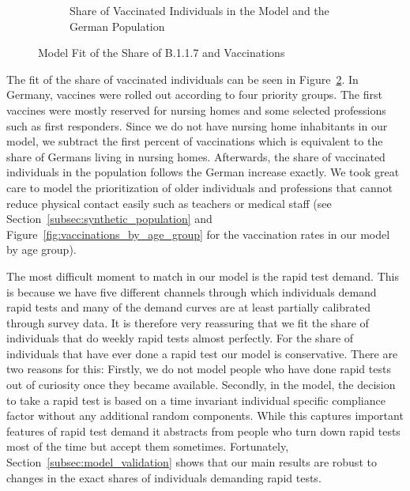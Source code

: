 \begin{figure}[ht]
\begin{subfigure}[b]{0.425\textwidth}
    \caption{Share of Vaccinated Individuals in the Model and the German Population}
    \label{fig:fit_vaccinations}
  \end{subfigure}
  \caption{Model Fit of the Share of B.1.1.7 and Vaccinations}
\end{figure}

The fit of the share of vaccinated individuals can be seen in
Figure~\ref{fig:fit_vaccinations}. In Germany, vaccines were rolled out according to four
priority groups. The first vaccines were mostly reserved for nursing homes and some
selected professions such as first responders. Since we do not have nursing home
inhabitants in our model, we subtract the first percent of vaccinations which is
equivalent to the share of Germans living in nursing homes. Afterwards, the share of
vaccinated individuals in the population follows the German increase exactly. We took
great care to model the prioritization of older individuals and professions that cannot
reduce physical contact easily such as teachers or medical staff (see
Section~\ref{subsec:synthetic_population} and Figure~\ref{fig:vaccinations_by_age_group}
for the vaccination rates in our model by age group).

\FloatBarrier

The most difficult moment to match in our model is the rapid test demand. This is because
we have five different channels through which individuals demand rapid tests and many of
the demand curves are at least partially calibrated through survey data. It is therefore
very reassuring that we fit the share of individuals that do weekly rapid tests almost
perfectly. For the share of individuals that have ever done a rapid test our model is
conservative. There are two reasons for this: Firstly, we do not model people who have
done rapid tests out of curiosity once they became available. Secondly, in the model, the
decision to take a rapid test is based on a time invariant individual specific compliance
factor without any additional random components. While this captures important features
of rapid test demand it abstracts from people who turn down rapid tests most of the time
but accept them sometimes. Fortunately, Section~\ref{subsec:model_validation} shows that
our main results are robust to changes in the exact shares of individuals demanding rapid
tests.

